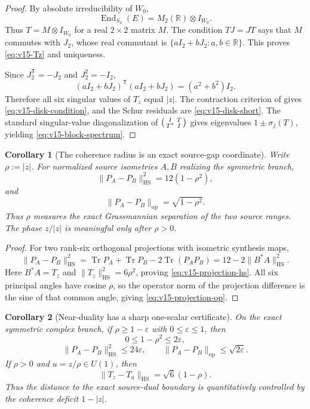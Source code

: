 \documentclass[11pt]{article}
\newtheorem{corollary}[corollary]{Corollary}
\theoremstyle{definition}
\theoremstyle{remark}
\newcommand{\R}{\mathbb R}
\newcommand{\Tr}{\operatorname{Tr}}
\newcommand{\End}{\operatorname{End}}
\newcommand{\HS}{\mathrm{HS}}
\newcommand{\op}{\mathrm{op}}
\begin{document}
\begin{proof}
By absolute irreducibility of $W_0$,
\[
 \End_{S_4}(E)=M_2(\R)\otimes I_{W_0}.
\]
Thus $T=M\otimes I_{W_0}$ for a real $2\times2$ matrix $M$.  The condition
$TJ=JT$ says that $M$ commutes with $J_2$, whose real commutant is
$\{aI_2+bJ_2:a,b\in\R\}$.  This proves \eqref{eq:v15-Tz} and uniqueness.

Since $J_2^{\mathsf T}=-J_2$ and $J_2^2=-I_2$,
\[
 (aI_2+bJ_2)^{\mathsf T}(aI_2+bJ_2)
 =(a^2+b^2)I_2.
\]
Therefore all six singular values of $T_z$ equal $|z|$.  The contraction
criterion of  gives
\eqref{eq:v15-disk-condition}, and the Schur residuals are
\eqref{eq:v15-disk-short}.  The standard singular-value diagonalization of
$\begin{psmallmatrix}I&T\\T^*&I\end{psmallmatrix}$ gives eigenvalues
$1\pm\sigma_j(T)$, yielding \eqref{eq:v15-block-spectrum}.
\end{proof}

\begin{corollary}[The coherence radius is an exact source-gap coordinate]
\label{cor:v15-coherence}
Write $\rho:=|z|$.  For normalized source isometries $A,B$ realizing the
symmetric branch,
\begin{equation}
 \boxed{
 \|P_A-P_B\|_{\HS}^2=12(1-\rho^2),}
 \label{eq:v15-projection-hs}
\end{equation}
and
\begin{equation}
 \boxed{
 \|P_A-P_B\|_{\op}=\sqrt{1-\rho^2}.}
 \label{eq:v15-projection-op}
\end{equation}
Thus $\rho$ measures the exact Grassmannian separation of the two source
ranges.  The phase $z/|z|$ is meaningful only after $\rho>0$.
\end{corollary}

\begin{proof}
For two rank-six orthogonal projections with isometric synthesis maps,
\[
 \|P_A-P_B\|_{\HS}^2
 =\Tr P_A+\Tr P_B-2\Tr(P_AP_B)
 =12-2\|B^*A\|_{\HS}^2.
\]
Here $B^*A=T_z$ and $\|T_z\|_{\HS}^2=6\rho^2$, proving
\eqref{eq:v15-projection-hs}.  All six principal angles have cosine $\rho$,
so the operator norm of the projection difference is the sine of that common
angle, giving \eqref{eq:v15-projection-op}.
\end{proof}

\begin{corollary}[Near-duality has a sharp one-scalar certificate]
\label{cor:v15-near-duality}
On the exact symmetric complex branch, if $\rho\ge1-\varepsilon$ with
$0\le\varepsilon\le1$, then
\[
 0\le1-\rho^2\le2\varepsilon,
\]
\[
 \|P_A-P_B\|_{\HS}^2\le24\varepsilon,
 \qquad
 \|P_A-P_B\|_{\op}\le\sqrt{2\varepsilon}.
\]
If $\rho>0$ and $u=z/\rho\in U(1)$, then
\[
 \boxed{
 \|T_z-T_u\|_{\HS}=\sqrt6(1-\rho).}
 \label{eq:v15-polar-distance}
\]
Thus the distance to the exact source-dual boundary is quantitatively
controlled by the coherence deficit $1-|z|$.
\end{corollary}
\end{document}
